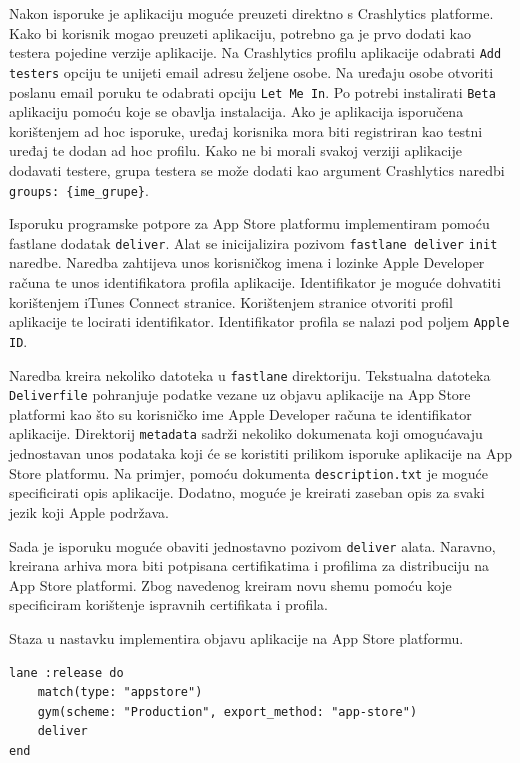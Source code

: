 \documentclass[times, utf8, diplomski, numeric]{fer}
\begin{document}
\begin{appendices}
Nakon isporuke je aplikaciju moguće preuzeti direktno s Crashlytics platforme. Kako bi korisnik mogao preuzeti aplikaciju, potrebno ga je prvo dodati kao testera pojedine verzije aplikacije. Na Crashlytics profilu aplikacije odabrati \verb|Add testers| opciju te unijeti email adresu željene osobe. Na uređaju osobe otvoriti poslanu email poruku te odabrati opciju \verb|Let Me In|. Po potrebi instalirati \verb|Beta| aplikaciju pomoću koje se obavlja instalacija. Ako je aplikacija isporučena korištenjem ad hoc isporuke, uređaj korisnika mora biti registriran kao testni uređaj te dodan ad hoc profilu. Kako ne bi morali svakoj verziji aplikacije dodavati testere, grupa testera se može dodati kao argument Crashlytics naredbi \verb|groups: {ime_grupe}|.

Isporuku programske potpore za App Store platformu implementiram pomoću fastlane dodatak \verb|deliver|\citep{fastlane:deliver}. Alat se inicijalizira pozivom \verb|fastlane deliver| \verb|init| naredbe. Naredba zahtijeva unos korisničkog imena i lozinke Apple Developer računa te unos identifikatora profila aplikacije. Identifikator je moguće dohvatiti korištenjem iTunes Connect stranice. Korištenjem stranice otvoriti profil aplikacije te locirati identifikator. Identifikator profila se nalazi pod poljem \verb|Apple ID|.

Naredba kreira nekoliko datoteka u \verb|fastlane| direktoriju. Tekstualna datoteka \verb|Deliverfile| pohranjuje podatke vezane uz objavu aplikacije na App Store platformi kao što su korisničko ime Apple Developer računa te identifikator aplikacije. Direktorij \verb|metadata| sadrži nekoliko dokumenata koji omogućavaju jednostavan unos podataka koji će se koristiti prilikom isporuke aplikacije na App Store platformu. Na primjer, pomoću dokumenta \verb|description.txt| je moguće specificirati opis aplikacije. Dodatno, moguće je kreirati zaseban opis za svaki jezik koji Apple podržava.

Sada je isporuku moguće obaviti jednostavno pozivom \verb|deliver| alata. Naravno, kreirana arhiva mora biti potpisana certifikatima i profilima za distribuciju na App Store platformi. Zbog navedenog kreiram novu shemu pomoću koje specificiram korištenje ispravnih certifikata i profila.

Staza u nastavku implementira objavu aplikacije na App Store platformu.

\begin{lstlisting}[caption=Isporuka na App Store platformu korištenjem dodatka deliver]
lane :release do
    match(type: "appstore")
    gym(scheme: "Production", export_method: "app-store")
    deliver
end
\end{lstlisting}


\end{appendices}
\end{document}
